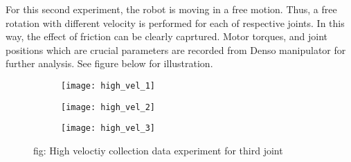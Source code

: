For this second experiment, the robot is moving in a free motion. Thus, a free rotation with different velocity is performed for each of respective joints. In this way, the effect of friction can be clearly caprtured. Motor torques, and joint positions which are crucial parameters are recorded from Denso manipulator for further analysis. See figure below for illustration.
\begin{figure}[H]
\centering  
  \begin{subfigure}[t]{0.3\textwidth}
    \centering
    \texttt{[image: high\_vel\_1]} 
  \end{subfigure}
  \begin{subfigure}[t]{0.3\textwidth}
    \centering
    \texttt{[image: high\_vel\_2]}
  \end{subfigure}
  \begin{subfigure}[t]{0.3\textwidth}
    \centering
    \texttt{[image: high\_vel\_3]}
  \end{subfigure}
  \caption{fig: High veloctiy collection data experiment for third joint}
\end{figure}


